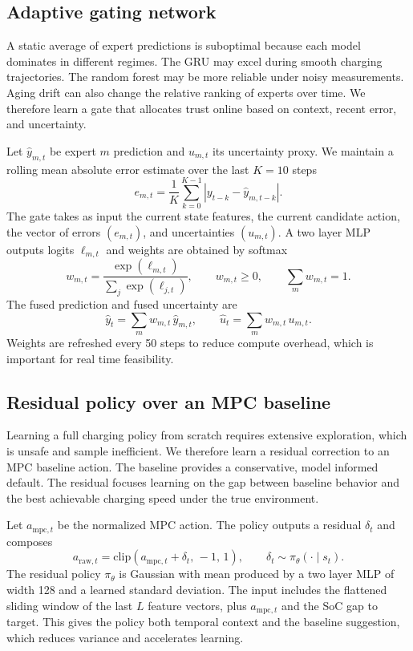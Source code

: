 \documentclass[%
 aip,
 amsmath,amssymb,
reprint, onecolumn %
]{revtex4-1}
\begin{document}
\subsection{Adaptive gating network}
A static average of expert predictions is suboptimal because each model dominates in different regimes. The GRU may excel during smooth charging trajectories. The random forest may be more reliable under noisy measurements. Aging drift can also change the relative ranking of experts over time. We therefore learn a gate that allocates trust online based on context, recent error, and uncertainty.

Let $\hat y_{m,t}$ be expert $m$ prediction and $u_{m,t}$ its uncertainty proxy. We maintain a rolling mean absolute error estimate over the last $K=10$ steps
\begin{equation}
e_{m,t} = \frac{1}{K}\sum_{k=0}^{K-1} \left|y_{t-k} - \hat y_{m,t-k}\right|.
\end{equation}
The gate takes as input the current state features, the current candidate action, the vector of errors $(e_{m,t})$, and uncertainties $(u_{m,t})$. A two layer MLP outputs logits $\ell_{m,t}$ and weights are obtained by softmax
\begin{equation}
w_{m,t} = \frac{\exp(\ell_{m,t})}{\sum_j \exp(\ell_{j,t})},
\qquad
w_{m,t} \ge 0,
\qquad
\sum_m w_{m,t}=1.
\end{equation}
The fused prediction and fused uncertainty are
\begin{equation}
\hat y_t = \sum_m w_{m,t}\,\hat y_{m,t},
\qquad
\hat u_t = \sum_m w_{m,t}\,u_{m,t}.
\end{equation}
Weights are refreshed every 50 steps to reduce compute overhead, which is important for real time feasibility.

\subsection{Residual policy over an MPC baseline}
Learning a full charging policy from scratch requires extensive exploration, which is unsafe and sample inefficient. We therefore learn a residual correction to an MPC baseline action. The baseline provides a conservative, model informed default. The residual focuses learning on the gap between baseline behavior and the best achievable charging speed under the true environment.

Let $a_{\mathrm{mpc},t}$ be the normalized MPC action. The policy outputs a residual $\delta_t$ and composes
\begin{equation}
a_{\mathrm{raw},t} = \mathrm{clip}\!\left(a_{\mathrm{mpc},t} + \delta_t,\,-1,\,1\right),
\qquad
\delta_t \sim \pi_\theta(\cdot \mid s_t).
\end{equation}
The residual policy $\pi_\theta$ is Gaussian with mean produced by a two layer MLP of width 128 and a learned standard deviation. The input includes the flattened sliding window of the last $L$ feature vectors, plus $a_{\mathrm{mpc},t}$ and the SoC gap to target. This gives the policy both temporal context and the baseline suggestion, which reduces variance and accelerates learning.
\end{document}
